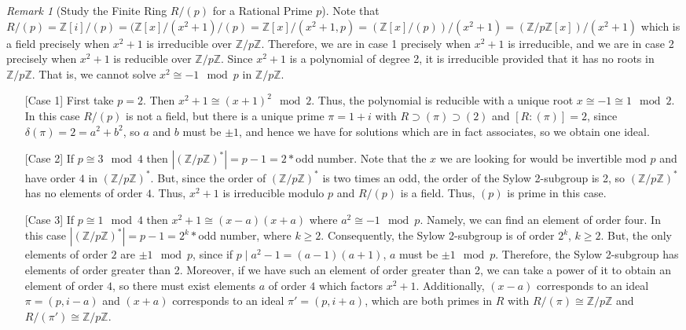 \documentclass[12pt]{article}
\theoremstyle{definition}
\theoremstyle{remark}
\newtheorem{rmk}[thm]{Remark}
\numberwithin{equation}{section}
\newcommand\Z{\mathbb Z}    %
\begin{document}
\begin{rmk}[Study the Finite Ring $R/(p)$ for a Rational Prime $p$]
        Note that $R/(p) = \Z[i]/(p) = (\Z[x]/(x^2+1)/(p) = \Z[x]/(x^2+1,p) = (\Z[x]/(p))/(x^2+1) = (\Z/p\Z[x])/(x^2+1)$ which is a field precisely when $x^2+1$ is irreducible over $\Z/p\Z$. Therefore, we are in case 1 precisely when $x^2+1$ is irreducible, and we are in case 2 precisely when $x^2+1$ is reducible over $\Z/p\Z$. Since $x^2+1$ is a polynomial of degree 2, it is irreducible provided that it has no roots in $\Z/p\Z$. That is, we cannot solve $x^2 \cong -1 \mod p$ in $\Z/p\Z$. \begin{enumerate}
                \item[] [Case 1] First take $p =2$. Then $x^2 + 1 \cong (x+1)^2 \mod 2$. Thus, the polynomial is reducible with a unique root $x \cong -1 \cong 1 \mod 2$. In this case $R/(p)$ is not a field, but there is a unique prime $\pi = 1+i$ with $R \supset (\pi) \supset (2)$ and $[R:(\pi)] = 2$, since $\delta(\pi) = 2 = a^2 + b^2$, so $a$ and $b$ must be $\pm 1$, and hence we have for solutions which are in fact associates, so we obtain one ideal.
                \item[] [Case 2] If $p \cong 3\mod 4$ then $|(\Z/p\Z)^*| = p-1 = 2*$odd number. Note that the $x$ we are looking for would be invertible mod $p$ and have order $4$ in $(\Z/p\Z)^*$. But, since the order of $(\Z/p\Z)^*$ is two times an odd, the order of the Sylow 2-subgroup is 2, so $(\Z/p\Z)^*$ has no elements of order $4$. Thus, $x^2+1$ is irreducible modulo $p$ and $R/(p) $ is a field. Thus, $(p)$ is prime in this case.
                \item[] [Case 3] If $p \cong 1\mod 4$ then $x^2+1 \cong (x-a)(x+a)$ where $a^2 \cong -1 \mod p$. Namely, we can find an element of order four. In this case $|(\Z/p\Z)^*| = p-1 = 2^k*$odd number, where $k \geq 2$. Consequently, the Sylow 2-subgroup is of order $2^k$, $k \geq 2$. But, the only elements of order $2$ are $\pm 1 \mod p$, since if $p\;\vert\;a^2 - 1 = (a-1)(a+1)$, $a$ must be $\pm 1 \mod p$. Therefore, the Sylow 2-subgroup has elements of order greater than 2. Moreover, if we have such an element of order greater than 2, we can take a power of it to obtain an element of order $4$, so there must exist elements $a$ of order $4$ which factors $x^2+1$. Additionally, $(x-a)$ corresponds to an ideal $\pi = (p,i-a)$ and $(x+a)$ corresponds to an ideal $\pi' = (p,i+a)$, which are both primes in $R$ with $R/(\pi) \cong \Z/p\Z$ and $R/(\pi')\cong \Z/p\Z$.
        \end{enumerate}
\end{rmk}
\end{document}
